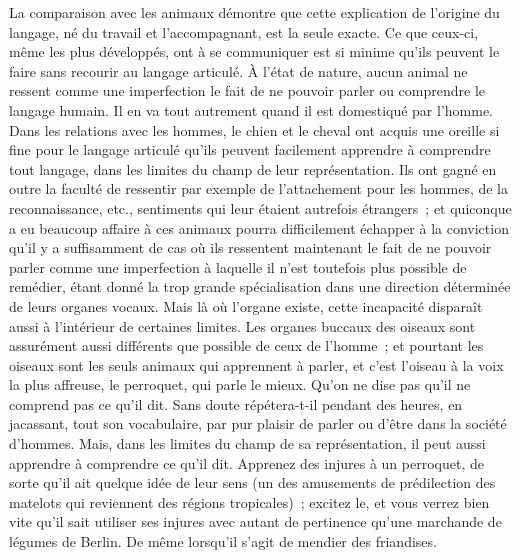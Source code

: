 \documentclass[french,twoside]{book} %
\begin{document}
La comparaison avec les animaux démontre que cette explication de l’origine du langage, né du travail et l’accompagnant, est la seule exacte. Ce que ceux-ci, même les plus développés, ont à se communiquer est si minime qu’ils peuvent le faire sans recourir au langage articulé. À l’état de nature, aucun animal ne ressent comme une imperfection le fait de ne pouvoir parler ou comprendre le langage humain. Il en va tout autrement quand il est domestiqué par l’homme. Dans les relations avec les hommes, le chien et le cheval ont acquis une oreille si fine pour le langage articulé qu’ils peuvent facilement apprendre à comprendre tout langage, dans les limites du champ de leur représentation. Ils ont gagné en outre la faculté de ressentir par exemple de l’attachement pour les hommes, de la reconnaissance, etc., sentiments qui leur étaient autrefois étrangers ; et quiconque a eu beaucoup affaire à ces animaux pourra difficilement échapper à la conviction qu’il y a suffisamment de cas où ils ressentent maintenant le fait de ne pouvoir parler comme une imperfection à laquelle il n’est toutefois plus possible de remédier, étant donné la trop grande spécialisation dans une direction déterminée de leurs organes vocaux. Mais là où l’organe existe, cette incapacité disparaît aussi à l’intérieur de certaines limites. Les organes buccaux des oiseaux sont assurément aussi différents que possible de ceux de l’homme ; et pourtant les oiseaux sont les seuls animaux qui apprennent à parler, et c’est l’oiseau à la voix la plus affreuse, le perroquet, qui parle le mieux. Qu’on ne dise pas qu’il ne comprend pas ce qu’il dit. Sans doute répétera-t-il pendant des heures, en jacassant, tout son vocabulaire, par pur plaisir de parler ou d’être dans la société d’hommes. Mais, dans les limites du champ de sa représentation, il peut aussi apprendre à comprendre ce qu’il dit. Apprenez des injures à un perroquet, de sorte qu’il ait quelque idée de leur sens (un des amusements de prédilection des matelots qui reviennent des régions tropicales) ; excitez le, et vous verrez bien vite qu’il sait utiliser ses injures avec autant de pertinence qu’une marchande de légumes de Berlin. De même lorsqu’il s’agit de mendier des friandises.\par
\end{document}
